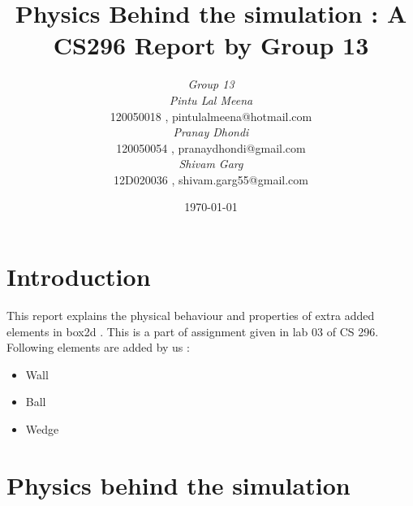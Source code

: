 \documentclass[11pt]{article}
\begin{document}



\title {Physics Behind the simulation : A CS296 Report by Group 13 }
\author {\emph{Group 13} \\ %
	\emph{Pintu Lal Meena} \\
	 \textrm{120050018} ,  \textsf{pintulalmeena@hotmail.com} \\
	\emph{Pranay Dhondi } \\
	\textrm{120050054} , \textsf{pranaydhondi@gmail.com} \\
	\emph{Shivam Garg}\\
	\textrm{12D020036} , \textsf{shivam.garg55@gmail.com}}
\date{\today}   %
\maketitle
\section{Introduction}
This report explains the physical behaviour and properties of extra
added elements in box2d . This is a part of assignment given in lab 03 of CS 296.
\newline
Following elements are added by us :
\begin{itemize}
\item Wall 
\item Ball
\item Wedge
\end{itemize}
\section{Physics behind the simulation}
\end{document}
